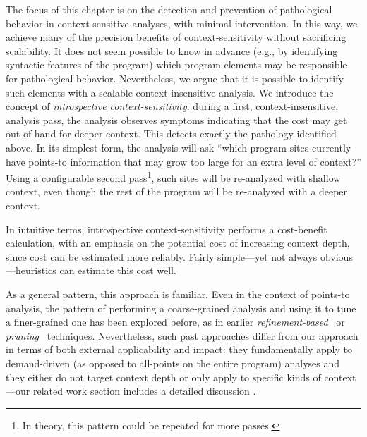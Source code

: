 The focus of this chapter is on the detection and prevention of pathological behavior in context-sensitive analyses, with minimal intervention. In this way, we achieve many of the precision benefits of context-sensitivity without sacrificing scalability. It does not seem possible to know in advance (e.g., by identifying syntactic features of the program) which program elements may be responsible for pathological behavior. Nevertheless, we argue that it is possible to identify such elements with a scalable context-insensitive analysis. We introduce the concept of \emph{introspective context-sensitivity}: during a first, context-insensitive, analysis pass, the analysis observes symptoms indicating that the cost may get out of hand for deeper context. This detects exactly the pathology identified above. In its simplest form, the analysis will ask ``which program sites currently have points-to information that may grow too large for an extra level of context?'' Using a configurable second pass\footnote{In theory, this pattern could be repeated for more passes.}, such sites will be re-analyzed with shallow context, even though the rest of the program will be re-analyzed with a deeper context.

In intuitive terms, introspective context-sensitivity performs a cost-benefit calculation, with an emphasis on the potential cost of increasing context depth, since cost can be estimated more reliably. Fairly simple---yet not always obvious---heuristics can estimate this cost well. 

As a general pattern, this approach is familiar. Even in the context of points-to analysis, the pattern of performing a coarse-grained analysis and using it to tune a finer-grained one has been explored before, as in earlier \emph{refinement-based}~\cite{pldi:2006:Sridharan} or \emph{pruning}~\cite{pldi:2011:Liang} techniques. Nevertheless, such past approaches differ from our approach in terms of both external applicability and impact: they fundamentally apply to demand-driven (as opposed to all-points on the entire program) analyses and they either do not target context depth or only apply to specific kinds of context---our related work section includes a detailed discussion \todo{}.

